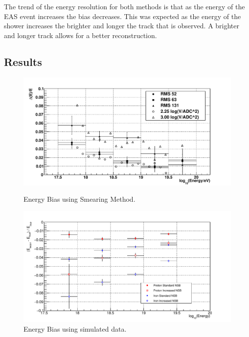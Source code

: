 The trend of the energy resolution for both methods is that as the energy of the EAS event increases the bias decreases. This was expected as the energy of the shower increases the brighter and longer the track that is observed. A brighter and longer track allows for a better reconstruction.

\subsection{Results}
\begin{figure}
\centering
\includegraphics[width=\textwidth]{chapters/graphs/SelectionEff/Smearing_RealData_EnergyBias.pdf}
\caption{Energy Bias using Smearing Method.}
\vspace{3mm}
\includegraphics[width=\textwidth]{chapters/graphs/SelectionEff/Simulation_ProtonIron_EnergyBias.pdf}
\caption{Energy Bias using simulated data.}
\end{figure}

